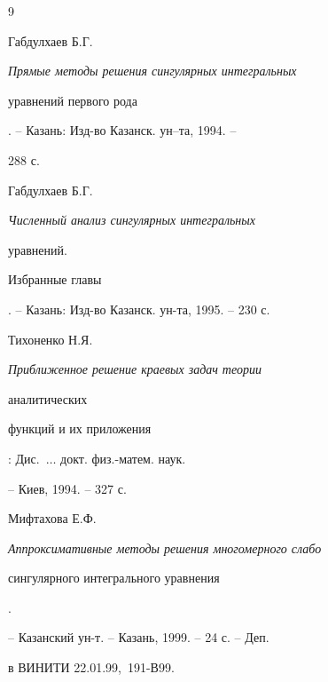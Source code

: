 \begin{thebibliography}{9} 


 




Габдулхаев Б.Г. {\em Прямые методы решения сингулярных интегральных 


уравнений первого рода}. -- Казань: Изд-во Казанск. ун--та, 1994. -- 


288 с. 




Габдулхаев Б.Г. {\em Численный анализ сингулярных интегральных 


уравнений. 


Избранные главы}. -- Казань: Изд-во Казанск. ун-та, 1995. -- 230 с. 




Тихоненко Н.Я. {\em Приближенное решение краевых задач теории 


аналитических 


функций и их приложения}: Дис.~$\dotsc$ докт. физ.-матем. наук. 


-- Киев, 1994. -- 327 с. 




Мифтахова Е.Ф. {\em Аппроксимативные методы решения многомерного слабо 


сингулярного интегрального уравнения}. 


-- Казанский ун-т. -- Казань, 1999. -- 24 с. -- Деп. 


в ВИНИТИ 22.01.99, \No\,191-В99. 


 


\end{thebibliography} 


 


\vskip 2cm 


 






 


\label{end} 


 


 


